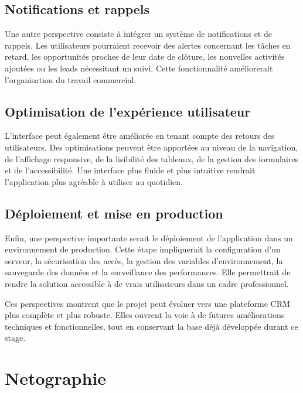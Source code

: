 \documentclass[12pt,a4paper]{report}
\begin{document}
\section*{Notifications et rappels}

Une autre perspective consiste à intégrer un système de notifications et de rappels. Les utilisateurs pourraient recevoir des alertes concernant les tâches en retard, les opportunités proches de leur date de clôture, les nouvelles activités ajoutées ou les leads nécessitant un suivi. Cette fonctionnalité améliorerait l’organisation du travail commercial.

\section*{Optimisation de l’expérience utilisateur}

L’interface peut également être améliorée en tenant compte des retours des utilisateurs. Des optimisations peuvent être apportées au niveau de la navigation, de l’affichage responsive, de la lisibilité des tableaux, de la gestion des formulaires et de l’accessibilité. Une interface plus fluide et plus intuitive rendrait l’application plus agréable à utiliser au quotidien.

\section*{Déploiement et mise en production}

Enfin, une perspective importante serait le déploiement de l’application dans un environnement de production. Cette étape impliquerait la configuration d’un serveur, la sécurisation des accès, la gestion des variables d’environnement, la sauvegarde des données et la surveillance des performances. Elle permettrait de rendre la solution accessible à de vrais utilisateurs dans un cadre professionnel.

Ces perspectives montrent que le projet peut évoluer vers une plateforme CRM plus complète et plus robuste. Elles ouvrent la voie à de futures améliorations techniques et fonctionnelles, tout en conservant la base déjà développée durant ce stage.
\chapter*{Netographie}
\end{document}
